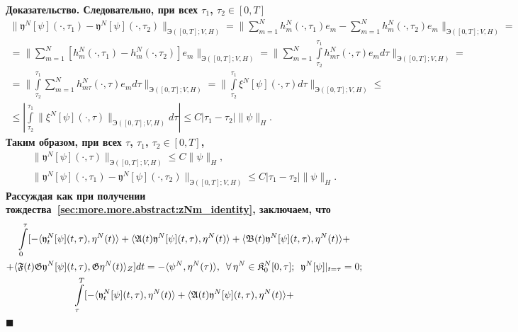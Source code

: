\documentclass{report}
\newenvironment{Proof}{\par\noindent\bf Доказательство.\rm}{ $\blacksquare$\par}
\begin{document}
\begin{Proof}
Следовательно, при всех $\tau_1$, $\tau_2\in[0,T]$
\begin{gather*}
\|\mathfrak{y}^N[\psi](\cdot,\tau_1)-\mathfrak{y}^N[\psi](\cdot,\tau_2)\|_{\textrm{Э}([0,T]; V,H)}= {\biggl\|}\sum\limits_{m=1}^Nh^N_m(\cdot,\tau_1)e_m-\sum\limits_{m=1}^Nh^N_m(\cdot,\tau_2)e_m{\biggr\|}_{\textrm{Э}([0,T]; V,H)}=\\
=\biggl\|\sum\limits_{m=1}^N[h^N_m(\cdot,\tau_1)-h^N_m(\cdot,\tau_2)]e_m{\biggr\|}_{\textrm{Э}([0,T]; V,H)} =
\biggl\|\sum\limits_{m=1}^N\int\limits_{\tau_2}^{\tau_1}h^N_{m\tau}(\cdot,\tau)e_md\tau{\biggr\|}_{\textrm{Э}([0,T]; V,H)}=\\
=\biggl\|\int\limits_{\tau_2}^{\tau_1}\sum\limits_{m=1}^Nh^N_{m\tau}(\cdot,\tau)e_md\tau{\biggr\|}_{\textrm{Э}([0,T]; V,H)}=
{\biggl\|}\int\limits_{\tau_2}^{\tau_1}\xi^N[\psi](\cdot,\tau)d\tau{\biggr\|}_{\textrm{Э}([0,T]; V,H)}\leqslant\\
\leqslant\left|\int\limits_{\tau_2}^{\tau_1}{\|}\xi^N[\psi](\cdot,\tau){\|}_{\textrm{Э}([0,T]; V,H)}d\tau\right|\leqslant C|\tau_1-\tau_2|\|\psi\|_H.
\end{gather*}
Таким образом, при всех $\tau$, $\tau_1$, $\tau_2\in[0,T]$,
\begin{gather}
\label{thetaN_energetic_estimate:nonaut:parametric}
\|\mathfrak{y}^{N}[\psi](\cdot,\tau)\|_{\textrm{Э}([0,T]; V,H)}\leqslant C\|\psi\|_H,\\
\label{thetaN_difference_energetic_estimate:nonaut:parametric}
\|\mathfrak{y}^N[\psi](\cdot,\tau_1)-\mathfrak{y}^N[\psi](\cdot,\tau_2)\|_{\textrm{Э}([0,T]; V,H)}\leqslant C|\tau_1-\tau_2|\|\psi\|_H.
\end{gather}
Рассуждая как при получении тождества~\eqref{sec:more.more.abstract:zNm_identity}, заключаем, что
\begin{gather}
\label{thetaN_identity1:nonaut:parametric}
\int\limits_0^\tau[-\langle\mathfrak{y}^{N}_t[\psi](t,\tau),{\eta}^{N}(t)\rangle+\langle\mathfrak{A}(t)\mathfrak{y}^{N}[\psi](t,\tau),\eta^{N}(t)\rangle+
\langle\mathfrak{B}(t)\mathfrak{y}^{N}[\psi](t,\tau),\eta^{N}(t)\rangle+\\
\notag+\langle\mathfrak{F}(t) \mathfrak{G}\mathfrak{y}^{N}[\psi](t,\tau), \mathfrak{G}\eta^{N}(t)\rangle_Z]dt=-\langle\psi^{N},\eta^{N}(\tau)\rangle,\,\,\,\forall\,\eta^N\in\mathfrak{K}^N_{0}[0,\tau];\,\,\,
\mathfrak{y}^{N}[\psi]|_{t=\tau}=0;\\
\label{thetaN_identity2:nonaut:parametric}
\int\limits_\tau^T[-\langle\mathfrak{y}^{N}_t[\psi](t,\tau),{\eta}^{N}(t)\rangle+\langle\mathfrak{A}(t)\mathfrak{y}^{N}[\psi](t,\tau),\eta^{N}(t)\rangle+

\end{gather}
\end{Proof}
\end{document}
